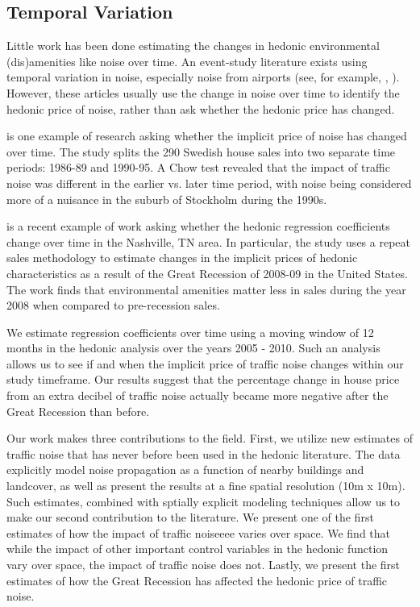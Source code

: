 \documentclass{article}\usepackage{graphicx, color}
\begin{document}
\subsection{Temporal Variation}
Little work has been done estimating the changes in hedonic environmental (dis)amenities like noise over time. An event-study literature exists using temporal variation in noise, especially noise from airports (see, for example, \citet{Cohen2009}, ). However, these articles usually use the change in noise over time to identify the hedonic price of noise, rather than ask whether the hedonic price has changed.

\citet{Wilhelmsson2000} is one example of research asking whether the implicit price of noise has changed over time. The study splits the 290 Swedish house sales into two separate time periods: 1986-89 and 1990-95. A Chow test revealed that the impact of traffic noise was different in the earlier vs. later time period, with noise being considered more of a nuisance in the suburb of Stockholm during the 1990s. 

\citet{Cho2011b} is a recent example of work asking whether the hedonic regression coefficients change over time in the Nashville, TN area. In particular, the study uses a repeat sales methodology to estimate changes in the implicit prices of hedonic characteristics as a result of the Great Recession of 2008-09 in the United States. The work finds that environmental amenities matter less in sales during the year 2008 when compared to pre-recession sales.

We estimate regression coefficients over time using a moving window of 12 months in the hedonic analysis over the years 2005 - 2010. Such an analysis allows us to see if and when the implicit price of traffic noise changes within our study timeframe. Our results suggest that the percentage change in house price from an extra decibel of traffic noise actually became more negative after the Great Recession than before. 

Our work makes three contributions to the field. First, we utilize new estimates of traffic noise that has never before been used in the hedonic literature. The data explicitly model noise propagation as a function of nearby buildings and landcover, as well as present the results at a fine spatial resolution (10m x 10m). Such estimates, combined with sptially explicit modeling techniques allow us to make our second contribution to the literature. We present one of the first estimates of how the impact of traffic noiseeee varies over space. We find that while the impact of other important control variables in the hedonic function vary over space, the impact of traffic noise does not. Lastly, we present the first estimates of how the Great Recession has affected the hedonic price of traffic noise.
\end{document}
